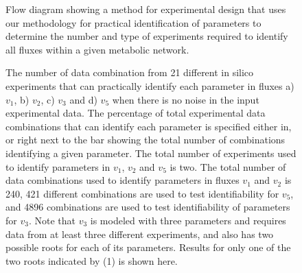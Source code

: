 \documentclass[10pt]{article}
\begin{document}
	\begin{figure}[!tbhp]
		\caption{Flow diagram showing a method for experimental design that uses our methodology for practical identification of parameters to determine the number and type of experiments required to identify all fluxes within a given metabolic network.}\label{fig:ident-design}
	\end{figure}

	\begin{figure}[!tbhp]
		\caption{The number of data combination from 21 different in silico experiments that can practically identify each parameter in fluxes a) $v_1$, b) $v_2$, c) $v_3$ and d) $v_5$ when there is no noise in the input experimental data. The percentage of total experimental data combinations that can identify each parameter is specified either in, or right next to the bar showing the total number of combinations identifying a given parameter. The total number of experiments used to identify parameters in $v_1$, $v_2$ and $v_5$ is two. The total number of data combinations used to identify parameters in fluxes $v_1$ and $v_2$ is 240, 421 different combinations are used to test identifiability for $v_5$, and 4896 combinations are used to test identifiability of parameters for $v_3$. Note that $v_3$ is modeled with three parameters and requires data from at least three different experiments, and also has two possible roots for each of its parameters. Results for only one of the two roots indicated by (1) is shown here.}\label{fig:ident}
	\end{figure}
\end{document}
